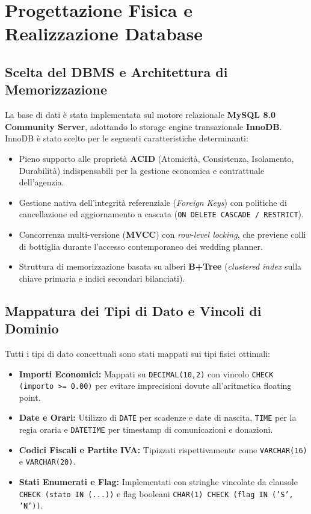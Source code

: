 \chapter{Progettazione Fisica e Realizzazione Database}

\section{Scelta del DBMS e Architettura di Memorizzazione}
La base di dati è stata implementata sul motore relazionale \textbf{MySQL 8.0 Community Server}, adottando lo storage engine transazionale \textbf{InnoDB}. 
InnoDB è stato scelto per le seguenti caratteristiche determinanti:
\begin{itemize}[noitemsep]
    \item Pieno supporto alle proprietà \textbf{ACID} (Atomicità, Consistenza, Isolamento, Durabilità) indispensabili per la gestione economica e contrattuale dell'agenzia.
    \item Gestione nativa dell'integrità referenziale (\textit{Foreign Keys}) con politiche di cancellazione ed aggiornamento a cascata (\texttt{ON DELETE CASCADE / RESTRICT}).
    \item Concorrenza multi-versione (\textbf{MVCC}) con \textit{row-level locking}, che previene colli di bottiglia durante l'accesso contemporaneo dei wedding planner.
    \item Struttura di memorizzazione basata su alberi \textbf{B+Tree} (\textit{clustered index} sulla chiave primaria e indici secondari bilanciati).
\end{itemize}

\section{Mappatura dei Tipi di Dato e Vincoli di Dominio}
Tutti i tipi di dato concettuali sono stati mappati sui tipi fisici ottimali:
\begin{itemize}[noitemsep]
    \item \textbf{Importi Economici:} Mappati su \texttt{DECIMAL(10,2)} con vincolo \texttt{CHECK (importo >= 0.00)} per evitare imprecisioni dovute all'aritmetica floating point.
    \item \textbf{Date e Orari:} Utilizzo di \texttt{DATE} per scadenze e date di nascita, \texttt{TIME} per la regia oraria e \texttt{DATETIME} per timestamp di comunicazioni e donazioni.
    \item \textbf{Codici Fiscali e Partite IVA:} Tipizzati rispettivamente come \texttt{VARCHAR(16)} e \texttt{VARCHAR(20)}.
    \item \textbf{Stati Enumerati e Flag:} Implementati con stringhe vincolate da clausole \texttt{CHECK (stato IN (...))} e flag booleani \texttt{CHAR(1) CHECK (flag IN ('S', 'N'))}.
\end{itemize}

